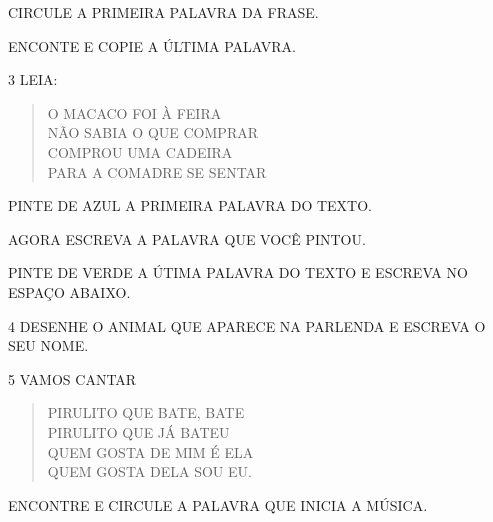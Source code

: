 \begin{escola}
\begin{escolha}
\item CIRCULE A PRIMEIRA PALAVRA DA FRASE.

\item ENCONTE E COPIE A ÚLTIMA PALAVRA.

\end{escolha}

\num{3} LEIA:

\begin{verse}
O MACACO FOI À FEIRA\\
NÃO SABIA O QUE COMPRAR\\
COMPROU UMA CADEIRA\\
PARA A COMADRE SE SENTAR
\end{verse}


\begin{escolha}
\item PINTE DE AZUL A PRIMEIRA PALAVRA DO TEXTO.

\item AGORA ESCREVA A PALAVRA QUE VOCÊ PINTOU.


\item PINTE DE VERDE A ÚTIMA PALAVRA DO TEXTO E ESCREVA NO ESPAÇO ABAIXO.

\end{escolha}

\num{4} DESENHE O ANIMAL QUE APARECE NA PARLENDA E ESCREVA O SEU NOME.


\num{5} VAMOS CANTAR


\begin{verse}
PIRULITO QUE BATE, BATE\\
PIRULITO QUE JÁ BATEU\\
QUEM GOSTA DE MIM É ELA\\
QUEM GOSTA DELA SOU EU.
\end{verse}

\begin{escolha}
\item ENCONTRE E CIRCULE A PALAVRA QUE INICIA A MÚSICA.


\end{escolha}
\end{escola}
